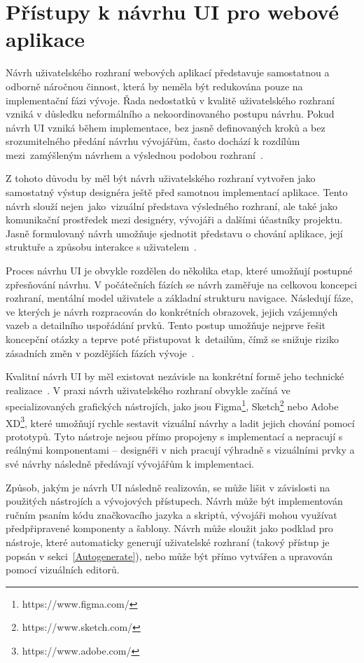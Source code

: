 \section{Přístupy k návrhu UI pro webové aplikace}
\label{UiPristupy}

Návrh uživatelského rozhraní webových aplikací představuje samostatnou a odborně náročnou činnost, která by neměla být redukována pouze na implementační fázi vývoje. Řada nedostatků v kvalitě uživatelského rozhraní vzniká v důsledku neformálního a nekoordinovaného postupu návrhu. Pokud návrh UI vzniká během implementace, bez jasně definovaných kroků a bez srozumitelného předání návrhu vývojářům, často dochází k rozdílům mezi~zamýšleným návrhem a výslednou podobou rozhraní~\cite{Design}.

Z tohoto důvodu by měl být návrh uživatelského rozhraní vytvořen jako samostatný výstup designéra ještě před samotnou implementací aplikace. Tento návrh slouží nejen~jako~vizuální představa výsledného rozhraní, ale také jako komunikační prostředek mezi designéry, vývojáři a dalšími účastníky projektu. Jasně formulovaný návrh umožňuje sjednotit představu o chování aplikace, její struktuře a způsobu interakce s uživatelem~\cite{Design}.

Proces návrhu UI je obvykle rozdělen do několika etap, které umožňují postupné zpřesňování návrhu. V počátečních fázích se návrh zaměřuje na celkovou koncepci rozhraní, mentální model uživatele a základní strukturu navigace. Následují fáze, ve kterých je návrh rozpracován do konkrétních obrazovek, jejich vzájemných vazeb a detailního uspořádání prvků. Tento postup umožňuje nejprve řešit koncepční otázky a teprve poté přistupovat k~detailům, čímž se snižuje riziko zásadních změn v pozdějších fázích vývoje~\cite{Design}.

Kvalitní návrh UI by měl existovat nezávisle na konkrétní formě jeho technické realizace~\cite{Design}. V praxi návrh uživatelského rozhraní obvykle začíná ve specializovaných grafických nástrojích, jako jsou Figma\footnote{https://www.figma.com/}, Sketch\footnote{https://www.sketch.com/} nebo Adobe XD\footnote{https://www.adobe.com/}, které umožňují rychle sestavit vizuální návrhy a ladit jejich chování pomocí prototypů. Tyto nástroje nejsou přímo propojeny s implementací a nepracují s reálnými komponentami -- designéři v nich pracují výhradně s vizuálními prvky a své návrhy následně předávají vývojářům k implementaci.

Způsob, jakým je návrh UI následně realizován, se může lišit v závislosti na použitých nástrojích a vývojových přístupech. Návrh může být implementován ručním psaním kódu značkovacího jazyka a skriptů, vývojáři mohou využívat předpřipravené komponenty a šablony. Návrh může sloužit jako podklad pro nástroje, které automaticky generují uživatelské rozhraní (takový přístup je popsán v sekci~\ref{Autogenerate}), nebo může být přímo vytvářen a upravován pomocí vizuálních editorů.

